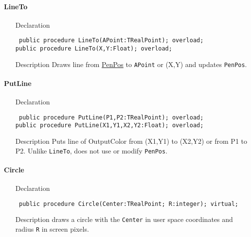 \documentclass[12pt,a4paper,oneside]{report}
\newcommand{\declarationitem}[1]{{\addfontfeatures{FakeSlant} #1}}
\newcommand{\descriptiontitle}[1]{{\addfontfeatures{FakeSlant}#1}}
\newcommand{\code}[1]{\texttt{#1}}
\begin{document}
\paragraph{LineTo}\label{sec:lineto}\hspace*{\fill}
\label{lmcoordsys.TCoordSys-LineTo}
\begin{itemize}\item[\declarationitem{Declaration}\hfill]
\begin{flushleft}
\code{
public procedure LineTo(APoint:TRealPoint); overload;\\
public procedure LineTo(X,Y:Float); overload;}
\end{flushleft}
\item[\descriptiontitle{Description}]
Draws line from \hyperref[lmcoordsys.TCoordSys-PenPos]{PenPos} to \code{APoint} or (X,Y) and updates \code{PenPos}.
\end{itemize}


\paragraph{PutLine}\hspace*{\fill}
\label{lmcoordsys.TCoordSys-PutLine}
\begin{itemize}\item[\declarationitem{Declaration}\hfill]
\begin{flushleft}
\code{
public procedure PutLine(P1,P2:TRealPoint); overload;\\
public procedure PutLine(X1,Y1,X2,Y2:Float); overload;}
\end{flushleft}
\item[\descriptiontitle{Description}]
Puts line of OutputColor from (X1,Y1) to (X2,Y2) or from P1 to P2. Unlike \code{LineTo}, does not use or modify \code{PenPos}.
\end{itemize}


\paragraph{Circle}\hspace*{\fill}
\label{lmcoordsys.TCoordSys-Circle}
\begin{itemize}\item[\declarationitem{Declaration}\hfill]
\begin{flushleft}
\code{
public procedure Circle(Center:TRealPoint; R:integer); virtual;}
\end{flushleft}
\item[\descriptiontitle{Description}]
draws a circle with the \code{Center} in user space coordinates and radius \code{R} in screen pixels.
\end{itemize}
\end{document}
